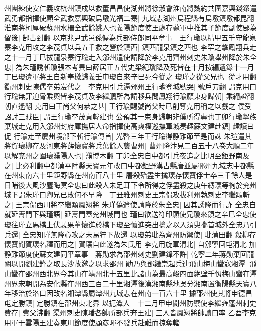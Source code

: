 州團練使安仁義攻杭州鎮戍以救董昌昌使湖州將徐淑會淮南將魏約共圍嘉興錢鏐遣武勇都指揮使顧全武救嘉興破烏墩光福二寨|{
	九域志湖州烏程縣有烏墩鎮墩都昆翻}
淮南將柯厚破蘇州水柵全武餘姚人也義陽節度使王處存薨軍中推其子節度副使郜為留後|{
	郜古到翻}
以京兆尹武邑孫偓為兵部侍郎同平章事　王行瑜以精甲五千守龍泉寨李克用攻之李茂貞以兵五千救之營於鎮西|{
	鎮西龍泉鎮之西也}
李罕之擊鳳翔兵走之十一月丁巳拔龍泉寨行瑜走入邠州遣使請降於李克用齊州刺史朱瓊舉州降於朱全忠|{
	為朱瑾誘斬瓊張本考異曰薛居正五代史梁紀瓊降及死皆在十月按編遺錄十一月丁巳瓊遺軍將王自新奉檄歸義壬申瓊自來辛巳死今從之}
瓊瑾之從父兄也|{
	從才用翻}
衢州刺史陳儒卒弟岌代之　李克用引兵逼邠州王行瑜登城號哭|{
	號戶刀翻}
謂克用曰行瑜無罪迫脅乘輿皆李茂貞及李繼鵬所為請移兵問鳳翔行瑜願束身歸朝|{
	乘繩證翻朝直遙翻}
克用曰王尚父何恭之甚|{
	王行瑜賜號尚父時已削奪克用稱之以戲之}
僕受詔討三賊臣|{
	謂王行瑜李茂貞韓建也}
公預其一束身歸朝非僕所得專也丁卯行瑜挈族棄城走克用入邠州封府庫撫居人命指揮使高爽權巡撫軍城奏趣蘇文建赴鎮|{
	趣讀曰促}
行瑜走至慶州境部下斬行瑜傳首|{
	光啓三年王行瑜得静難節至是而誅}
朱瑄遣其將賀瓌柳存及河東將薛懷寶將兵萬餘人襲曹州|{
	曹州降汴見二百五十八卷大順二年}
以解兖州之圍瓌濮陽人也|{
	濮博木翻}
丁卯全忠自中都引兵夜追之比明至鉅野南及之|{
	比必利翻中都漢平陸縣天寶元年改曰中都鉅野漢古縣唐並屬鄆州九域志中都縣在州東南六十里鉅野縣在州南百八十里}
屠殺殆盡生擒瓌存懷寶俘士卒三千餘人是日晡後大風沙塵晦冥全忠曰此殺人未足耳下令所得之俘盡殺之庚午縳瓌等徇於兖州城下謂朱瑾曰卿兄已敗何不早降　丁丑雅州刺史王宗侃攻拔利州執刺史李繼顒斬之|{
	王宗侃西川將李繼顒鳳翔將}
朱瑾偽遣使請降於朱全忠|{
	因其誘降而行詐}
全忠自就延夀門下與瑾語|{
	延夀門蓋兖州城門也}
瑾曰欲送符印願使兄瓊來領之辛巳全忠使瓊往瑾立馬橋上伏驍果董懷進於橋下瓊至懷進突出擒之以入須臾擲首城外全忠乃引兵還|{
	全忠知瑾無降心攻之未易猝下故還}
以瓊弟玭為齊州防禦使|{
	玭蒲田翻}
殺柳存懷寶聞賀瓌名釋而用之|{
	賀瓖自此遂為朱氏用}
李克用旋軍渭北|{
	自邠寧回屯渭北}
加静難節度使蘇文建同平章事　蔣勛求為邵州刺史劉建鋒不許|{
	乾寧二年蔣勛棄回龍關以開劉建鋒之取長沙故邀之以求邵州}
勛乃與鄧繼崇起兵連飛山梅山蠻寇湘潭|{
	飛山蠻在邵州西北界今其山在靖州北十五里比諸山為最高峻四面絶壁千仭梅山蠻在潭州界宋朝開為安化縣在州西三百二十里湘潭後漢湘南縣地吳分湘南置衡陽縣天寶八年移治於洛口因改名湘潭縣屬潭州九域志在州南一百六十里}
據邵州使其將申德昌屯定勝鎮|{
	定勝鎮在邵州東北界}
以扼潭人　十二月甲申閬州防禦使李繼雍蓬州刺史費存|{
	費父沸翻}
渠州刺史陳璠各帥所部兵奔王建|{
	三人皆鳳翔將帥讀曰率}
乙酉李克用軍于雲陽王建奏東川節度使顧彦暉不發兵赴難而掠奪輜

